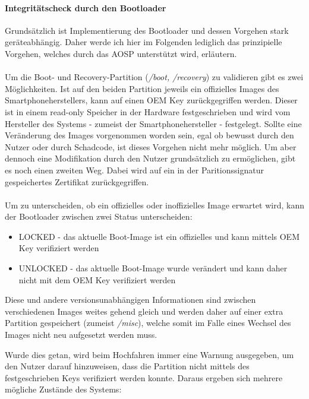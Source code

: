 	\paragraph{Integritätscheck durch den Bootloader}
	Grundsätzlich ist Implementierung des Bootloader und dessen Vorgehen stark geräteabhängig. Daher werde ich hier im Folgenden lediglich das prinzipielle Vorgehen, welches durch das AOSP unterstützt wird, erläutern.\\\\
	Um die Boot- und Recovery-Partition (\textit{/boot, /recovery}) zu validieren gibt es zwei Möglichkeiten. Ist auf den beiden Partition jeweils ein offizielles Images des Smartphoneherstellers, kann auf einen OEM Key zurückgegriffen werden. Dieser ist in einem read-only Speicher in der Hardware festgeschrieben und wird vom Hersteller des Systems - zumeist der Smartphonehersteller - festgelegt. Sollte eine Veränderung des Images vorgenommen worden sein, egal ob bewusst durch den Nutzer oder durch Schadcode, ist dieses Vorgehen nicht mehr möglich. Um aber dennoch eine Modifikation durch den Nutzer grundsätzlich zu ermöglichen, gibt es noch einen zweiten Weg. Dabei wird auf ein in der Paritionssignatur gespeichertes Zertifikat zurückgegriffen.\\\\
	Um zu unterscheiden, ob ein offizielles oder inoffizielles Image erwartet wird, kann der Bootloader zwischen zwei Status unterscheiden\cite{VerifiedBoot}:\\
	
	\begin{itemize}\itemsep0pt
		\item LOCKED - das aktuelle Boot-Image ist ein offizielles und kann mittels OEM Key verifiziert werden
		\item UNLOCKED - das aktuelle Boot-Image wurde verändert und kann daher nicht mit dem OEM Key verifiziert werden
	\end{itemize}
	
\begin{flushleft}
	Diese und andere versionsunabhängigen Informationen sind zwischen verschiedenen Images weites gehend gleich und werden daher auf einer extra Partition gespeichert (zumeist \textit{/misc}), welche somit im Falle eines Wechsel des Images nicht neu aufgesetzt werden muss.
\end{flushleft}
	 Wurde dies getan, wird beim Hochfahren immer eine Warnung ausgegeben, um den Nutzer darauf hinzuweisen, dass die Partition nicht mittels des festgeschrieben Keys verifiziert werden konnte. Daraus ergeben sich mehrere mögliche Zustände des Systems:\\\\
	
